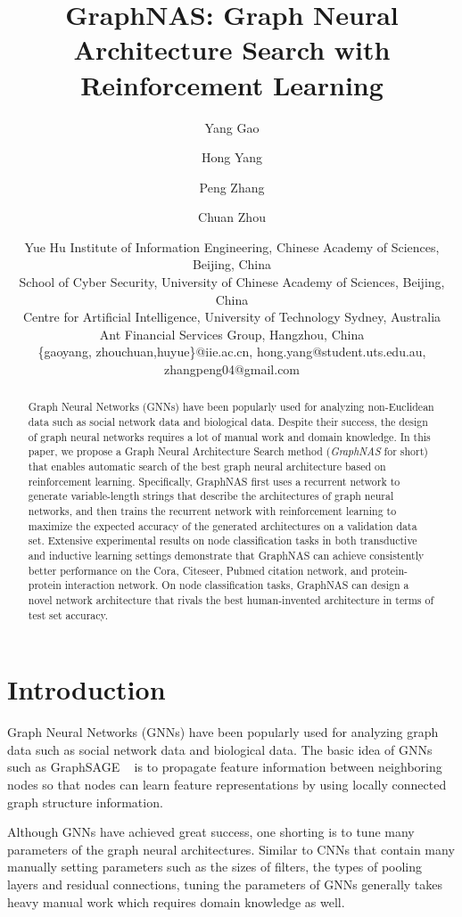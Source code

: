 \documentclass{article}
\title{GraphNAS: Graph Neural Architecture Search with Reinforcement Learning}
\author{
    Yang Gao \and
    Hong Yang \and
    Peng Zhang \and
    Chuan Zhou \and
    Yue Hu 
    \affiliations
    Institute of Information Engineering, Chinese Academy of Sciences, Beijing, China \\
    School of Cyber Security, University of Chinese Academy of Sciences, Beijing, China\\
    Centre for Artificial Intelligence, University of Technology Sydney, Australia\\
    Ant Financial Services Group, Hangzhou, China\\
    \emails
    \{gaoyang, zhouchuan,huyue\}@iie.ac.cn,
    hong.yang@student.uts.edu.au,
    zhangpeng04@gmail.com
}
\begin{document}
\maketitle

\begin{abstract}
Graph Neural Networks (GNNs) have been popularly used for analyzing non-Euclidean data such as social network data and biological data. 
Despite their success, the design of graph neural networks requires a lot of manual work and domain knowledge. In this paper, we propose a Graph Neural Architecture Search method (\textit{GraphNAS} for short) that enables automatic search of the best graph neural architecture based on reinforcement learning. Specifically, GraphNAS first uses a recurrent network to generate variable-length strings that describe the architectures of graph neural networks, and then trains the recurrent network with reinforcement learning to maximize the expected accuracy of the generated architectures on a validation data set. Extensive experimental results on node classification tasks in both transductive and inductive learning settings demonstrate that GraphNAS can achieve consistently better performance on the Cora, Citeseer, Pubmed citation network, and protein-protein interaction network. On node classification tasks, GraphNAS can design a novel network architecture that rivals the best human-invented architecture in terms of test set accuracy.
\end{abstract}

\section{Introduction}
Graph Neural Networks (GNNs) have been popularly used for analyzing graph data such as social network data and biological data. 
The basic idea of GNNs such as GraphSAGE ~\cite{GraphSAGE} is to propagate feature information between neighboring nodes so that nodes can learn feature representations by using locally connected graph structure information. 

Although GNNs have achieved great success, one shorting is to tune many parameters of the graph neural architectures. Similar to CNNs that contain many manually setting parameters such as the sizes of filters, the types of pooling layers and residual connections, tuning the parameters of GNNs generally takes heavy manual work which requires domain knowledge as well. 
\end{document}
